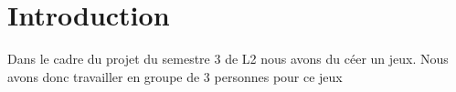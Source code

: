 \hypertarget{index_intro_sec}{}\section{Introduction}\label{index_intro_sec}
Dans le cadre du projet du semestre 3 de L2 nous avons du céer un jeux. Nous avons donc travailler en groupe de 3 personnes pour ce jeux

~\newline
~\newline
 